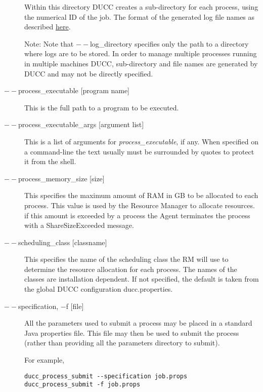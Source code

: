 \begin{description}
          Within this directory DUCC creates a sub-directory for each process, using the numerical 
          ID of the job. The format of the generated log file names as described
          \hyperref[chap:job-logs]{here}.
          
          Note: Note that $--$log\_directory specifies only the path to a directory where 
          logs are to be stored. In order to manage multiple processes running in multiple 
          machines DUCC, sub-directory and file names are generated by DUCC and may 
          not be directly specified. 

        \item[$--$process\_executable {[program name]}] This is the full path to a program to be
          executed.

        \item[$--$process\_executable\_args {[argument list]}] This is a list of arguments for
          {\em process\_executable}, if any.   When specified on a command-line the text usually must be
          surrounded by quotes to protect it from the shell.

        \item[$--$process\_memory\_size {[size]} ] This specifies the maximum amount of RAM in GB to
          be allocated to each process.  This value is used by the Resource Manager to allocate
          resources. if this amount is exceeded by a process the Agent terminates the process with a
          ShareSizeExceeded message.

        \item[$--$scheduling\_class {[classname]} ] This specifies the name of the scheduling class the
          RM will use to determine the resource allocation for each process. The names of the
          classes are installation dependent. If not specified, the default is taken from the global
          DUCC configuration ducc.properties.

        \item[$--$specification, $-$f {[file]} ] All the parameters used to submit a process may be placed
          in a standard Java properties file.  This file may then be used to submit the process
          (rather than providing all the parameters directory to submit).
          
          For example, 
\begin{verbatim}
ducc_process_submit --specification job.props 
ducc_process_submit -f job.props 
\end{verbatim}


\end{description}
